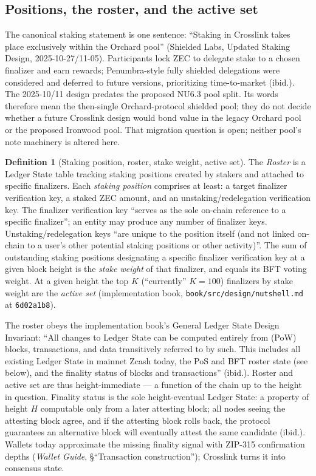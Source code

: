 \documentclass[11pt,a4paper]{article}
\theoremstyle{definition}
\newtheorem{definition}[theorem]{Definition}
\begin{document}
\subsection{Positions, the roster, and the active set}
\label{sec:xl-stake-roster}

The canonical staking statement is one sentence: ``Staking in Crosslink
takes place exclusively within the Orchard pool'' (Shielded Labs, Updated
Staking Design, 2025-10-27/11-05). Participants lock ZEC to delegate stake
to a chosen finalizer and earn rewards; Penumbra-style fully shielded
delegations were considered and deferred to future versions, prioritizing
time-to-market (ibid.). The 2025-10/11 design predates the proposed
NU6.3 pool split. Its words therefore mean the then-single
Orchard-protocol shielded pool; they do not decide whether a future
Crosslink design would bond value in the legacy Orchard pool or the
proposed Ironwood pool. That migration question is open; neither pool's
note machinery is altered here.

\begin{definition}[Staking position, roster, stake weight, active set]
\label{def:xl-roster}
The \emph{Roster} is a Ledger State table tracking staking positions
created by stakers and attached to specific finalizers. Each
\emph{staking position} comprises at least: a target finalizer
verification key, a staked ZEC amount, and an unstaking/redelegation
verification key. The finalizer verification key ``serves as the sole
on-chain reference to a specific finalizer''; an entity may produce any
number of finalizer keys. Unstaking/redelegation keys ``are unique to the
position itself (and not linked on-chain to a user's other potential
staking positions or other activity)''. The sum of outstanding staking
positions designating a specific finalizer verification key at a given
block height is the \emph{stake weight} of that finalizer, and equals its
BFT voting weight. At a given height the top $K$ (``currently'' $K = 100$)
finalizers by stake weight are the \emph{active set} (implementation book,
\texttt{book/src/design/nutshell.md} at \texttt{6d02a1b8}).
\end{definition}

The roster obeys the implementation book's General Ledger State Design
Invariant: ``All changes to Ledger State can be computed entirely from
(PoW) blocks, transactions, and data transitively referred to by such.
This includes all existing Ledger State in mainnet Zcash today, the PoS
and BFT roster state (see below), and the finality status of blocks and
transactions'' (ibid.). Roster and active set are thus height-immediate
--- a function of the chain up to the height in question. Finality status
is the sole height-eventual Ledger State: a property of height $H$
computable only from a later attesting block; all nodes seeing the
attesting block agree, and if the attesting block rolls back, the protocol
guarantees an alternative block will eventually attest the same candidate
(ibid.). Wallets today approximate the missing finality signal with
ZIP-315 confirmation depths (\emph{Wallet Guide}, \S``Transaction
construction''); Crosslink turns it into consensus state.
\end{document}
